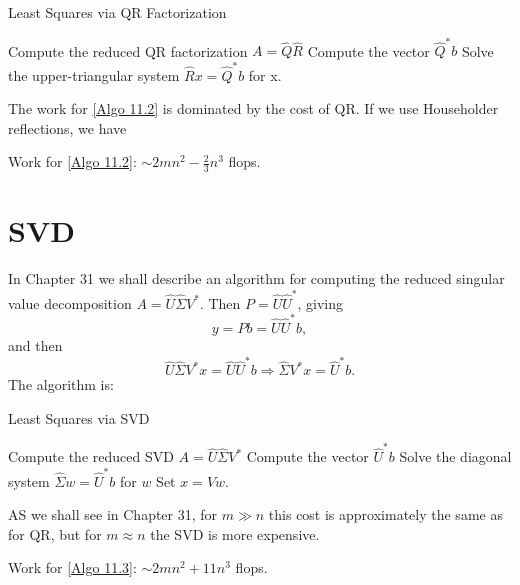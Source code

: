 \begin{algorithm}[H]
    \caption{Least Squares via QR Factorization}
    \label{Algo 11.2}
    Compute the reduced QR factorization $A= \hat Q \hat R$\; 
    Compute the vector $\hat Q^* b$\; 
    Solve the upper-triangular system $\hat Rx = \hat Q^* b$ for x. 
\end{algorithm}

The work for \autoref{Algo 11.2} is dominated by the cost of QR. If we use Householder reflections, we have 

\begin{corollary}
\label{cor: Cost of algo 11.2}
Work for \autoref{Algo 11.2}: $ \sim 2 m n^2-\frac{2}{3} n^3 $ flops. 
\end{corollary}


\section{SVD}
In Chapter 31 we shall describe an algorithm for computing the reduced singular value decomposition $A = \hat U \hat \Sigma V^*$. Then $P= \hat U \hat U^*$, giving 
\[
    y = Pb = \hat U \hat U^* b, 
\]
and then 
\[
    \hat U \hat \Sigma V^* x = \hat U \hat U^* b \Rightarrow \hat \Sigma V^* x = \hat U^* b. 
\]
The algorithm is: 

\begin{algorithm}[H]
    \caption{Least Squares via SVD}
    \label{Algo 11.3}
    Compute the reduced SVD $A= \hat U \hat \Sigma V^*$\; 
    Compute the vector $\hat U ^* b$\; 
    Solve the diagonal system $\hat \Sigma w = \hat U^* b$ for $w$\; 
    Set $x= Vw$. 
\end{algorithm}

AS we shall see in Chapter 31, for $m\gg n$ this cost is approximately the same as for QR, but for $m\approx n$ the SVD is more expensive. 


\begin{corollary}
\label{cor: cost of SVD LS}
Work for \autoref{Algo 11.3}: $\sim 2mn^2 +11n^3 $ flops.  
\end{corollary}

